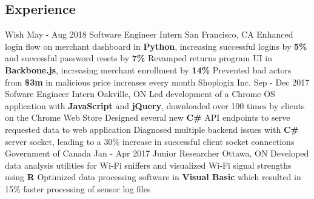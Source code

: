 \documentclass[]{aanguyen_res}
\begin{document}
	\begin{main}%
		\vspace{35pt}%
		\section{Experience}
			\mainentry%
				{Wish}%
				{May - Aug 2018}%
				{Software Engineer Intern}%
				{San Francisco, CA}%
				{\faCaretRight Enhanced login flow on merchant dashboard in \textbf{Python}, increasing successful logins by \textbf{5\%} and successful password resets by \textbf{7\%}
				\faCaretRight Revamped returns program UI in \textbf{Backbone.js}, increasing merchant enrollment by \textbf{14\%}
				\faCaretRight Prevented bad actors from \textbf{\$3m} in malicious price increases every month}
			\vspace{0.1cm}%
			\mainentry%
				{Shoplogix Inc.}%
				{Sep - Dec 2017}%
				{Sofware Engineer Intern}%
				{Oakville, ON}%
				{\faCaretRight Led development of a Chrome OS application with \textbf{JavaScript} and \textbf{jQuery}, downloaded over 100 times by clients on the Chrome Web Store
				\faCaretRight Designed several new \textbf{C\#} API endpoints to serve requested data to web application
				\faCaretRight Diagnosed multiple backend issues with \textbf{C\#} server socket, leading to a 30\% increase in successful client socket connections}
			\vspace{0.1cm}%
			\mainentry%
				{Government of Canada}%
				{Jan - Apr 2017}%
				{Junior Researcher}%
				{Ottawa, ON}%
				{\faCaretRight Developed data analysis utilities for Wi-Fi sniffers and visualized Wi-Fi signal strengths using \textbf{R}
				  \faCaretRight Optimized data processing software in \textbf{Visual Basic} which resulted in 15\% faster processing of sensor log files}
			\vspace{0.30cm}%

\end{main}
\end{document}
